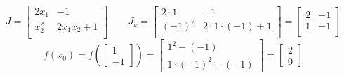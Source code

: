 \documentclass[12pt]{article}
\begin{document}
\begin{enumerate}
          \begin{solution}
              $$
                  J = \begin{bmatrix}
                      2x_1  & -1        \\
                      x_2^2 & 2x_1x_2+1 \\
                  \end{bmatrix}
                  \qquad
                  J_k = \begin{bmatrix}
                      2 \cdot 1 & -1                       \\
                      (-1)^{2}  & 2 \cdot 1 \cdot (-1) + 1 \\
                  \end{bmatrix} = \begin{bmatrix}
                      2 & -1 \\
                      1 & -1 \\
                  \end{bmatrix}
              $$
              $$
                  f \left( x_0 \right) = f \left( \begin{bmatrix}1 \\ -1 \end{bmatrix} \right) = \begin{bmatrix}
                      1^2 - (-1) \\
                      1 \cdot (-1)^2 + (-1)
                  \end{bmatrix} = \begin{bmatrix}
                      2 \\ 0
                  \end{bmatrix}
              $$


\end{solution}
\end{enumerate}
\end{document}
